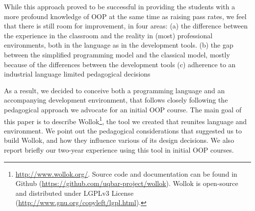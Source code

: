 While this approach proved to be successful in providing the students with a more profound knowledge of OOP at the same time as raising pass rates, 
we feel that there is still room for improvement, in four areas:
(a) the difference between the experience in the classroom and the reality in (most) professional environments, both in the language as in the development tools.
(b) the gap between the simplified programming model and the classical model, mostly because of the differences between the development tools
(c) adherence to an industrial language limited pedagogical decisions

As a result, we decided to conceive both a programming language and an accompanying development environment, that follows closely following the pedagogical approach we advocate for an initial OOP course. 
The main goal of this paper is to describe Wollok\footnote{
	\url{http://www.wollok.org/}. 
	Source code and documentation can be found in Github 
	(\url{https://github.com/uqbar-project/wollok}).
	Wollok is open-source and distributed under LGPLv3 License 
	(\url{http://www.gnu.org/copyleft/lgpl.html}).}, 
the tool we created that reunites language and environment. We point out the pedagogical considerations that suggested us to build Wollok, and how they influence various of its design decisions. We also report briefly our two-year experience using this tool in initial OOP courses.


